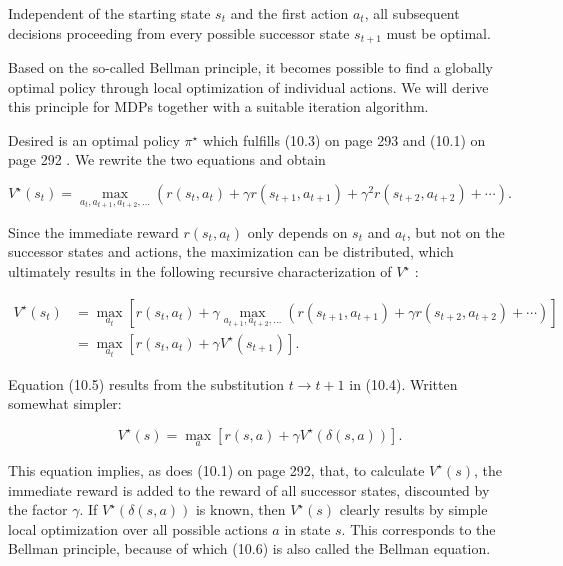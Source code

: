\documentclass[10pt]{book}
\begin{document}
Independent of the starting state $s_{t}$ and the first action $a_{t}$, all subsequent decisions proceeding from every possible successor state $s_{t+1}$ must be optimal.

Based on the so-called Bellman principle, it becomes possible to find a globally optimal policy through local optimization of individual actions. We will derive this principle for MDPs together with a suitable iteration algorithm.

Desired is an optimal policy $\pi^{\star}$ which fulfills (10.3) on page 293 and (10.1) on page 292 . We rewrite the two equations and obtain


\begin{equation*}
V^{\star}\left(s_{t}\right)=\max _{a_{t}, a_{t+1}, a_{t+2}, \ldots}\left(r\left(s_{t}, a_{t}\right)+\gamma r\left(s_{t+1}, a_{t+1}\right)+\gamma^{2} r\left(s_{t+2}, a_{t+2}\right)+\cdots\right) . \tag{10.4}
\end{equation*}


Since the immediate reward $r\left(s_{t}, a_{t}\right)$ only depends on $s_{t}$ and $a_{t}$, but not on the successor states and actions, the maximization can be distributed, which ultimately results in the following recursive characterization of $V^{\star}$ :


\begin{align*}
V^{\star}\left(s_{t}\right) & =\max _{a_{t}}\left[r\left(s_{t}, a_{t}\right)+\gamma \max _{a_{t+1}, a_{t+2}, \ldots}\left(r\left(s_{t+1}, a_{t+1}\right)+\gamma r\left(s_{t+2}, a_{t+2}\right)+\cdots\right)\right] \\
& =\max _{a_{t}}\left[r\left(s_{t}, a_{t}\right)+\gamma V^{\star}\left(s_{t+1}\right)\right] . \tag{10.5}
\end{align*}


Equation (10.5) results from the substitution $t \rightarrow t+1$ in (10.4). Written somewhat simpler:


\begin{equation*}
V^{\star}(s)=\max _{a}\left[r(s, a)+\gamma V^{\star}(\delta(s, a))\right] . \tag{10.6}
\end{equation*}


This equation implies, as does (10.1) on page 292, that, to calculate $V^{\star}(s)$, the immediate reward is added to the reward of all successor states, discounted by the factor $\gamma$. If $V^{\star}(\delta(s, a))$ is known, then $V^{\star}(s)$ clearly results by simple local optimization over all possible actions $a$ in state $s$. This corresponds to the Bellman principle, because of which (10.6) is also called the Bellman equation.
\end{document}
